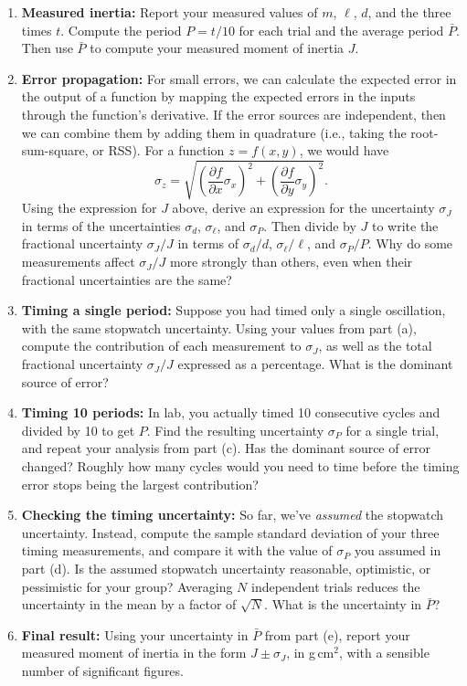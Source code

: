 \documentclass[11pt,letterpaper]{article}
\begin{document}
\begin{enumerate}[label=(\alph*)]
    \item \textbf{Measured inertia:} Report your measured values of $m$, $\ell$, $d$, and the three times $t$. Compute the period $P = t/10$ for each trial and the average period $\bar{P}$. Then use $\bar{P}$ to compute your measured moment of inertia $J$.

    \item \textbf{Error propagation:} For small errors, we can calculate the expected error in the output of a function by mapping the expected errors in the inputs through the function's derivative. If the error sources are independent, then we can combine them by adding them in quadrature (i.e., taking the root-sum-square, or RSS). For a function $z = f(x,y)$, we would have
    \[
    \sigma_z = \sqrt{\left( \frac{\partial f}{\partial x} \sigma_x \right)^2+ \left( \frac{\partial f}{\partial y} \sigma_y \right)^2}.
    \]
    Using the expression for $J$ above, derive an expression for the uncertainty $\sigma_J$ in terms of the uncertainties $\sigma_d$, $\sigma_\ell$, and $\sigma_P$. Then divide by $J$ to write the fractional uncertainty $\sigma_J/J$ in terms of $\sigma_d/d$, $\sigma_\ell/\ell$, and $\sigma_P/P$. Why do some measurements affect $\sigma_J/J$ more strongly than others, even when their fractional uncertainties are the same?

    \item \textbf{Timing a single period:} Suppose you had timed only a single oscillation, with the same stopwatch uncertainty. Using your values from part (a), compute the contribution of each measurement to $\sigma_J$, as well as the total fractional uncertainty $\sigma_J/J$ expressed as a percentage. What is the dominant source of error?

    \item \textbf{Timing 10 periods:} In lab, you actually timed 10 consecutive cycles and divided by 10 to get $P$. Find the resulting uncertainty $\sigma_P$ for a single trial, and repeat your analysis from part (c). Has the dominant source of error changed? Roughly how many cycles would you need to time before the timing error stops being the largest contribution?

    \item \textbf{Checking the timing uncertainty:} So far, we've \emph{assumed} the stopwatch uncertainty. Instead, compute the sample standard deviation of your three timing measurements, and compare it with the value of $\sigma_P$ you assumed in part (d). Is the assumed stopwatch uncertainty reasonable, optimistic, or pessimistic for your group? Averaging $N$ independent trials reduces the uncertainty in the mean by a factor of $\sqrt{N}$. What is the uncertainty in $\bar{P}$?

    \item \textbf{Final result:} Using your uncertainty in $\bar{P}$ from part (e), report your measured moment of inertia in the form $J \pm \sigma_J$, in g\,cm$^2$, with a sensible number of significant figures.
\end{enumerate}
\end{document}
